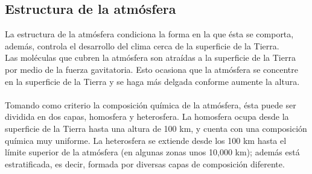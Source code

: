 \documentclass{article}
\begin{document}
\subsection{Estructura de la atmósfera}
La estructura de la atmósfera condiciona la forma en la que ésta se comporta, además, controla el desarrollo del clima cerca de la superficie de la Tierra. \\
Las moléculas que cubren la atmósfera son atraídas a la superficie de la Tierra por medio de la fuerza gavitatoria. Esto ocasiona que la atmósfera se concentre en la superficie de la Tierra y se haga más delgada conforme aumente la altura.\\
\\
Tomando como criterio la composición química de la atmósfera, ésta puede ser dividida en dos capas, homosfera y heterosfera. La homosfera ocupa desde la superficie de la Tierra hasta una altura de 100 km, y cuenta con una composición química muy uniforme. La heterosfera se extiende desde los 100 km hasta el límite superior de la atmósfera (en algunas zonas unos 10,000 km); además está estratificada, es decir, formada por diversas capas de composición diferente.  
\end{document}
